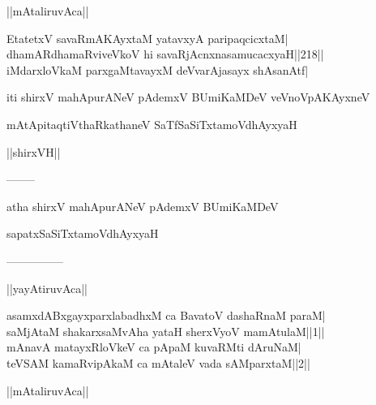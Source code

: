 \documentclass{article}
\begin{document}
\begin{center}
||mAtaliruvAca||
\end{center}

EtatetxV savaRmAKAyxtaM yatavxyA paripaqcicxtaM|\\
dhamARdhamaRviveVkoV hi savaRjAcnxnasamucacxyaH||218||\\
iMdarxloVkaM parxgaMtavayxM deVvarAjasayx shAsanAtf|

\begin{center}
iti shirxV mahApurANeV pAdemxV BUmiKaMDeV veVnoVpAKAyxneV
\end{center}

\begin{center}
mAtApitaqtiVthaRkathaneV SaTfSaSiTxtamoVdhAyxyaH
\end{center}

\begin{center}
||shirxVH||
\end{center}

\begin{center}
--------
\end{center}

\begin{center}
atha shirxV mahApurANeV pAdemxV BUmiKaMDeV
\end{center}

\begin{center}
sapatxSaSiTxtamoVdhAyxyaH
\end{center}

\begin{center}

---------------
\end{center}

\begin{center}
||yayAtiruvAca||
\end{center}

asamxdABxgayxparxlabadhxM ca BavatoV dashaRnaM paraM|\\
saMjAtaM shakarxsaMvAha yataH sherxVyoV mamAtulaM||1||\\
mAnavA matayxRloVkeV ca pApaM kuvaRMti dAruNaM|\\
teVSAM kamaRvipAkaM ca mAtaleV vada sAMparxtaM||2||\\

\begin{center}
||mAtaliruvAca||
\end{center}
\end{document}
